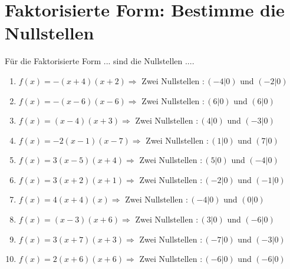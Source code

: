\documentclass{article}%
\begin{document}
\section{Faktorisierte Form: Bestimme die Nullstellen}%
\label{sec:FaktorisierteFormBestimmedieNullstellen}%
Für die Faktorisierte Form ... sind die Nullstellen ....%
\begin{enumerate}[label=\alph*)]%
\item%
\newline\vspace{0.5cm}$f(x)=-(x+4)(x+2) \Rightarrow $ Zwei Nullstellen $: (-4|0) $ und $ (-2|0) $%
\item%
\newline\vspace{0.5cm}$f(x)=-(x-6)(x-6) \Rightarrow $ Zwei Nullstellen $: (6|0) $ und $ (6|0) $%
\item%
\newline\vspace{0.5cm}$f(x)=(x-4)(x+3) \Rightarrow $ Zwei Nullstellen $: (4|0) $ und $ (-3|0) $%
\item%
\newline\vspace{0.5cm}$f(x)=-2(x-1)(x-7) \Rightarrow $ Zwei Nullstellen $: (1|0) $ und $ (7|0) $%
\item%
\newline\vspace{0.5cm}$f(x)=3(x-5)(x+4) \Rightarrow $ Zwei Nullstellen $: (5|0) $ und $ (-4|0) $%
\item%
\newline\vspace{0.5cm}$f(x)=3(x+2)(x+1) \Rightarrow $ Zwei Nullstellen $: (-2|0) $ und $ (-1|0) $%
\item%
\newline\vspace{0.5cm}$f(x)=4(x+4)(x) \Rightarrow $ Zwei Nullstellen $: (-4|0) $ und $ (0|0) $%
\item%
\newline\vspace{0.5cm}$f(x)=(x-3)(x+6) \Rightarrow $ Zwei Nullstellen $: (3|0) $ und $ (-6|0) $%
\item%
\newline\vspace{0.5cm}$f(x)=3(x+7)(x+3) \Rightarrow $ Zwei Nullstellen $: (-7|0) $ und $ (-3|0) $%
\item%
\newline\vspace{0.5cm}$f(x)=2(x+6)(x+6) \Rightarrow $ Zwei Nullstellen $: (-6|0) $ und $ (-6|0) $%
\end{enumerate}
\end{document}
